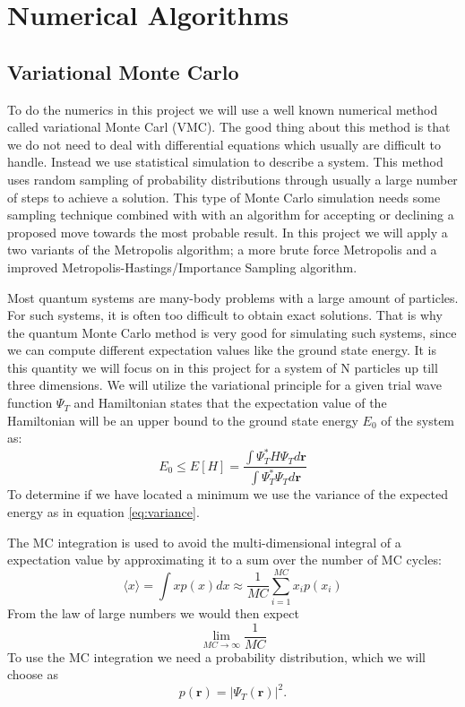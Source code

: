 \documentclass[12pt,a4paper,english]{article}
\begin{document}
\section{Numerical Algorithms}
\label{sect:Num_algos}
\subsection{Variational Monte Carlo}
\label{subsect:VMC}
To do the numerics in this project we will use a well known numerical method called variational Monte Carl (VMC). The good thing about this method is that we do not need to deal with differential equations which usually are difficult to handle. Instead we use statistical simulation to describe a system. This method uses random sampling of probability distributions through usually a large number of steps to achieve a solution. This type of Monte Carlo simulation needs some sampling technique combined with with an algorithm for accepting or declining a proposed move towards the most probable result. In this project we will apply a two variants of the Metropolis algorithm; a more brute force Metropolis and a improved Metropolis-Hastings/Importance Sampling algorithm. 

Most quantum systems are many-body problems with a large amount of particles. For such systems, it is often too difficult to obtain exact solutions. That is why the quantum Monte Carlo method is very good for simulating such systems, since we can compute different expectation values like the ground state energy. It is this quantity we will focus on in this project for a system of N particles up till three dimensions. We will utilize the variational principle for a given trial wave function $\Psi_T$ and Hamiltonian states that the expectation value of the Hamiltonian will be an upper bound to the ground state energy $E_0$ of the system as:
\begin{equation}
\label{eq:variational_prin}
E_0\leq E[H]=\frac{\int\Psi_T^*\hat{H}\Psi_Td\textbf{r}}{\int\Psi_T^*\Psi_T d\textbf{r}}
\end{equation}
To determine if we have located a minimum we use the variance of the expected energy as in equation \ref{eq:variance}.

The MC integration is used to avoid the multi-dimensional integral of a expectation value by approximating it to a sum over the number of MC cycles:
\begin{equation*}
\langle x\rangle =\int xp(x)dx\approx\frac{1}{MC}\sum_{i=1}^{MC}x_ip(x_i)
\end{equation*}
From the law of large numbers we would then expect
\[\lim\limits_{MC\rightarrow\infty}\frac{1}{MC}\]
To use the MC integration we need a probability distribution, which we will choose as 
\[p(\textbf{r})=|\Psi_T(\textbf{r})|^2.\]
\end{document}
